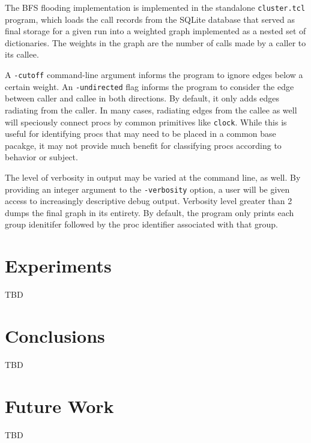 \documentclass{article}[letter,10pt]
\begin{document}
{{    The BFS flooding implementation is implemented in the standalone \texttt{cluster.tcl} program, which loads
    the call records from the SQLite database that served as final storage for a given run into a weighted graph
    implemented as a nested set of dictionaries. The weights in the graph are the number of calls made by a caller
    to its callee.

    A \texttt{-cutoff} command-line argument informs the program to ignore edges below a certain weight.
    An \texttt{-undirected} flag informs the program to consider the edge between caller and callee in both
    directions. By default, it only adds edges radiating from the caller. In many cases, radiating edges from
    the callee as well will speciously connect procs by common primitives like \texttt{clock}. While this is useful
    for identifying procs that may need to be placed in a common base pacakge, it may not provide much benefit
    for classifying procs according to behavior or subject.

    The level of verbosity in output may be varied at the command line, as well. By providing an integer argument
    to the \texttt{-verbosity} option, a user will be given access to increasingly descriptive debug output.
    Verbosity level greater than 2 dumps the final graph in its entirety. By default, the program only prints
    each group idenitifer followed by the proc identifier associated with that group.
  }
}

\section{Experiments}{
  TBD
}

\section{Conclusions}{
  TBD
}

\section{Future Work}{
  TBD
}

\printbibliography
\end{document}

